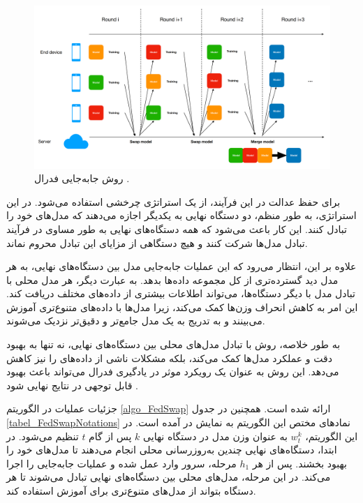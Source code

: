 \begin{figure}[b!]
	\centering
	\includegraphics[scale=0.2]{images/chap4/federated_swapping.png}%
	\caption{%
		روش جابه‌جایی فدرال
		\cite{chiu2020semisupervised}%
		.
	}
	\label{federated_swapping}
	\centering
\end{figure}


برای حفظ عدالت در این فرآیند، از یک استراتژی چرخشی%
استفاده می‌شود. در این استراتژی، به طور منظم، دو دستگاه نهایی به یکدیگر اجازه می‌دهند که مدل‌های خود را تبادل کنند. این کار باعث می‌شود که همه دستگاه‌های نهایی به طور مساوی در فرآیند تبادل مدل‌ها شرکت کنند و هیچ دستگاهی از مزایای این تبادل محروم نماند.

علاوه بر این، انتظار می‌رود که این عملیات جابه‌جایی مدل بین دستگاه‌های نهایی، به هر مدل دید گسترده‌تری از کل مجموعه داده‌ها بدهد. به عبارت دیگر، هر مدل محلی با تبادل مدل با دیگر دستگاه‌ها، می‌تواند اطلاعات بیشتری از داده‌های مختلف دریافت کند. این امر به کاهش انحراف وزن‌ها کمک می‌کند، زیرا مدل‌ها با داده‌های متنوع‌تری آموزش می‌بینند و به تدریج به یک مدل جامع‌تر و دقیق‌تر نزدیک می‌شوند.

به طور خلاصه، روش
با تبادل مدل‌های محلی بین دستگاه‌های نهایی، نه تنها به بهبود دقت و عملکرد مدل‌ها کمک می‌کند، بلکه مشکلات ناشی از داده‌های
را نیز کاهش می‌دهد. این روش به عنوان یک رویکرد موثر در یادگیری فدرال می‌تواند باعث بهبود قابل توجهی در نتایج نهایی شود
\cite{chiu2020semisupervised}.


جزئیات عملیات
در الگوریتم
\ref{algo_FedSwap}
ارائه شده است.
همچنین در جدول
\ref{tabel_FedSwapNotations}
نمادهای مختص این الگوریتم به نمایش در آمده است.
در این الگوریتم،
$w^k_t$
به عنوان وزن مدل در دستگاه نهایی
$k$
پس از گام
$t$
تنظیم می‌شود. در ابتدا، دستگاه‌های نهایی چندین به‌روزرسانی محلی انجام می‌دهند تا مدل‌های خود را بهبود بخشند. پس از هر
$h_1$
مرحله، سرور وارد عمل شده و عملیات جابه‌جایی را اجرا می‌کند. در این مرحله، مدل‌های محلی بین دستگاه‌های نهایی تبادل می‌شوند تا هر دستگاه بتواند از مدل‌های متنوع‌تری برای آموزش استفاده کند.

